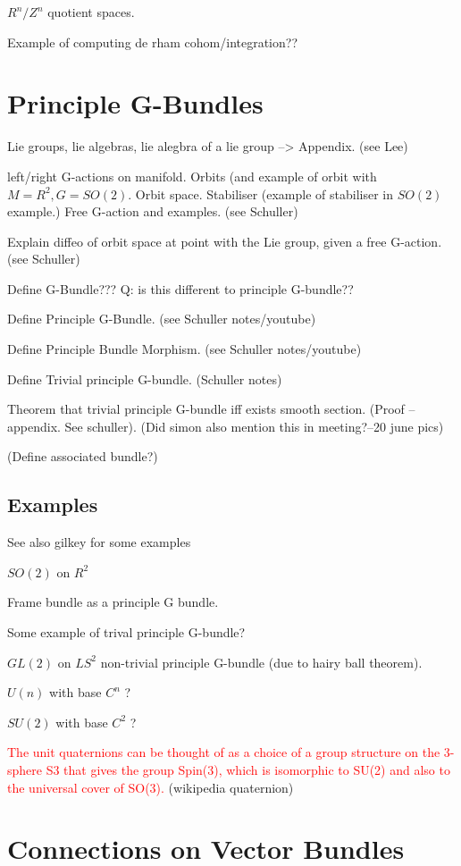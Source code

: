 \documentclass[a4paper]{article}
\theoremstyle{definition} \newtheorem*{definition}{Definition}
\theoremstyle{definition} \newtheorem*{definitions}{Definitions}
\theoremstyle{plain} \newtheorem{theorem}{Theorem}[section]
\theoremstyle{plain} \newtheorem{proposition}[theorem]{Proposition}
\theoremstyle{plain} \newtheorem{corollary}[theorem]{Corollary}
\theoremstyle{plain} \newtheorem{lemma}[theorem]{Lemma}
\theoremstyle{plain} \newtheorem{example}[theorem]{Example}
\newcommand{\understandBetter}[1]{\textcolor{red}{#1}}
\begin{document}
$R^n/Z^n$ quotient spaces. 

Example of computing de rham cohom/integration??

\section{Principle G-Bundles}

Lie groups, lie algebras, lie alegbra of a lie group --> Appendix. (see Lee)

left/right G-actions on manifold. Orbits (and example of orbit with $M=R^2, G=SO(2)$. Orbit space. Stabiliser (example of stabiliser in $SO(2)$ example.)
Free G-action and examples. (see Schuller)

Explain diffeo of orbit space at point with the Lie group, given a free G-action. (see Schuller)

Define G-Bundle??? Q: is this different to principle G-bundle??

Define Principle G-Bundle. (see Schuller notes/youtube)

Define Principle Bundle Morphism. (see Schuller notes/youtube)

Define Trivial principle G-bundle. (Schuller notes)

Theorem that trivial principle G-bundle iff exists smooth section. (Proof -- appendix. See schuller).  (Did simon also mention this in meeting?--20 june pics)

(Define associated bundle?)

\subsection{Examples}
See also gilkey for some examples

$SO(2)$ on $R^2$

Frame bundle as a principle G bundle.

Some example of trival principle G-bundle?

$GL(2)$ on $LS^2$ non-trivial principle G-bundle (due to hairy ball theorem).

$U(n)$ with base $C^n$ ?

$SU(2)$ with base $C^2$ ? 

\understandBetter{The unit quaternions can be thought of as a choice of a group structure on the 3-sphere S3 that gives the group Spin(3), which is isomorphic to SU(2) and also to the universal cover of SO(3).} (wikipedia quaternion)

\section{Connections on Vector Bundles}
\end{document}
